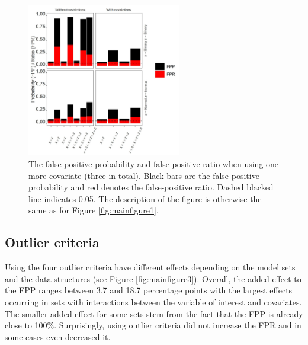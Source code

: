 \begin{figure}[hbt!]
\includegraphics[width=0.6\textwidth]{R/Analysis/Result/Figures/Figure1C.jpeg}
\centering
\caption{The false-positive probability and false-positive ratio when using one more covariate (three in total). Black bars are the false-positive probability and red denotes the false-positive ratio. Dashed blacked line indicates 0.05. The description of the figure is otherwise the same as for Figure \ref{fig:mainfigure1}.}
\label{fig:mainfigure2}
\end{figure}

\subsection{Outlier criteria}
Using the four outlier criteria have different effects depending on the model sets and the data structures (see Figure \ref{fig:mainfigure3}). Overall, the added effect to the FPP ranges between 3.7 and 18.7 percentage points with the largest effects occurring in sets with interactions between the variable of interest and covariates. The smaller added effect for some sets stem from the fact that the FPP is already close to 100\%. Surprisingly, using outlier criteria did not increase the FPR and in some cases even decreased it. 

